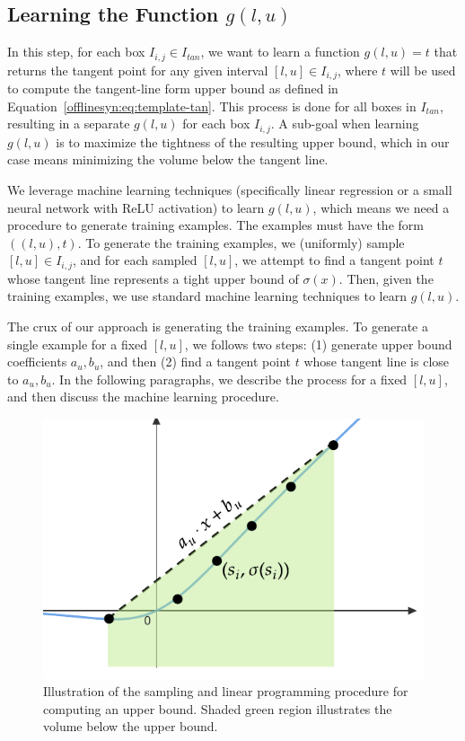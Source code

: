 \subsection{Learning the Function $ g(l, u) $}\label{offlinesyn:sec:learning}

In this step, for each box $ I_{i,j} \in I_{tan} $, we want to learn a
function $ g(l, u) = t $ that returns the tangent point for any given
interval $[l,u] \in I_{i,j}$, where $ t $ will be used to compute the
tangent-line form upper bound as defined in
Equation~\ref{offlinesyn:eq:template-tan}.
%
This process is done for all boxes in $ I_{tan} $,
resulting in a separate $ g(l, u) $ for each box $ I_{i,j} $.
%
A sub-goal when learning $
g(l, u) $ is to maximize the tightness of the resulting upper bound, which in
our case means minimizing the volume below the tangent line.

We leverage machine learning techniques (specifically linear regression
or a small neural network with ReLU activation) to learn $ g(l, u) $, which means we need a
procedure to generate training examples. The examples must have the form $ ((l,
u), t) $. To generate the training examples, we
(uniformly) sample $ [l, u] \in I_{i,j} $, and for each sampled $ [l, u] $, we
attempt to find a tangent point $ t $ whose tangent line represents a tight
upper bound of
$\sigma(x)$. Then, given the training examples, we use standard machine
learning techniques to learn $ g(l, u) $.

The crux of our approach is generating the training examples. To generate a
single example for a fixed $ [l, u] $, we follows two steps: (1) generate
upper bound coefficients $ a_u, b_u $, and then (2) find a tangent point
$ t $ whose tangent line is close to $ a_u, b_u $. In the following paragraphs, we
describe the process for a fixed $ [l, u] $, and then discuss the machine
learning procedure.

\begin{figure}[t]
	\centering
	\includegraphics[width=0.5\linewidth]{offlinesyn/figs/sampling-lp.pdf}
	\caption{Illustration of the sampling and linear programming procedure for
	computing an upper bound. Shaded green region illustrates the volume below
	the upper bound.\label{offlinesyn:fig:samplelp}}
\end{figure}

